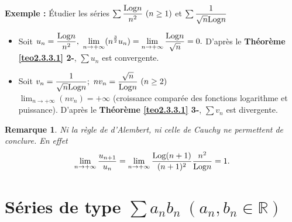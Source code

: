 \documentclass[11pt, a4paper]{book}
\newtheorem{rem}{Remarque}[section]
\begin{document}
\textbf{Exemple :}  \'Etudier les s\'eries $\sum \dfrac{\mathrm{Log} n}{n^2}~(n\geq1)$ et $\sum \dfrac{1}{\sqrt{n} \mathrm{Log} n}$ \begin{itemize}
\item Soit $u_n=\dfrac{\mathrm{Log} n}{n^2},~{\displaystyle \lim_{n\rightarrow+\infty}(n^{\frac{3}{2}} u_n)=\lim_{n\rightarrow+\infty}\dfrac{\mathrm{Log} n}{\sqrt{n}}=0.}$ D'apr\`es le \textbf{Th\'eor\`eme \ref{teo2.3.3.1} 2-}, $\sum u_n$ est convergente.
\item Soit $v_n=\dfrac{1}{\sqrt{n} \mathrm{Log} n}; ~ n v_n=\dfrac{\sqrt{n}}{\mathrm{Log} n} ~(n\geq2)$\\ ${\displaystyle \lim_{n\rightarrow+\infty}(n v_n)=+\infty}$ (croissance compar\'ee des fonctions logarithme et puissance). D'apr\`es le \textbf{Th\'eor\`eme \ref{teo2.3.3.1} 3-}, $\sum v_n$ est divergente.
\end{itemize}
\begin{rem}  Ni la r\`egle de d'Alembert, ni celle de Cauchy ne permettent de conclure.
 En effet $$ \lim_{n\rightarrow+\infty}\dfrac{u_{n+1}}{u_n}=\lim_{n\rightarrow+\infty} \dfrac{\mathrm{Log}(n+1)}{(n+1)^2}\dfrac{n^2}{\mathrm{Log} n}=1.$$\end{rem}

\section{S\'eries de type $\sum a_n b_n  ~(a_n, b_n \in \mathbb{R})$} 
\end{document}
